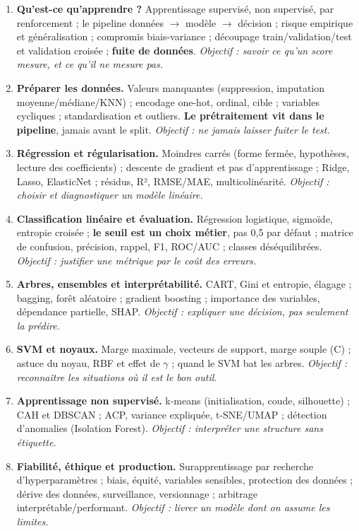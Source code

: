 \documentclass[10.5pt,a4paper]{article}
\begin{document}
\footnotesize
\begin{enumerate}[itemsep=3pt]
  \item \textbf{Qu'est-ce qu'apprendre ?} Apprentissage supervisé, non supervisé, par
        renforcement ; le pipeline données $\rightarrow$ modèle $\rightarrow$ décision ;
        risque empirique et généralisation ; compromis biais-variance ; découpage
        train/validation/test et validation croisée ; \textbf{fuite de données}.
        \textit{Objectif : savoir ce qu'un score mesure, et ce qu'il ne mesure pas.}

  \item \textbf{Préparer les données.} Valeurs manquantes (suppression, imputation
        moyenne/médiane/KNN) ; encodage one-hot, ordinal, cible ; variables cycliques ;
        standardisation et outliers. \textbf{Le prétraitement vit dans le pipeline},
        jamais avant le split. \textit{Objectif : ne jamais laisser fuiter le test.}

  \item \textbf{Régression et régularisation.} Moindres carrés (forme fermée, hypothèses,
        lecture des coefficients) ; descente de gradient et pas d'apprentissage ;
        Ridge, Lasso, ElasticNet ; résidus, R², RMSE/MAE, multicolinéarité.
        \textit{Objectif : choisir et diagnostiquer un modèle linéaire.}

  \item \textbf{Classification linéaire et évaluation.} Régression logistique, sigmoïde,
        entropie croisée ; \textbf{le seuil est un choix métier}, pas 0,5 par défaut ;
        matrice de confusion, précision, rappel, F1, ROC/AUC ; classes déséquilibrées.
        \textit{Objectif : justifier une métrique par le coût des erreurs.}

  \item \textbf{Arbres, ensembles et interprétabilité.} CART, Gini et entropie, élagage ;
        bagging, forêt aléatoire ; gradient boosting ; importance des variables,
        dépendance partielle, SHAP. \textit{Objectif : expliquer une décision, pas seulement
        la prédire.}

  \item \textbf{SVM et noyaux.} Marge maximale, vecteurs de support, marge souple (C) ;
        astuce du noyau, RBF et effet de $\gamma$ ; quand le SVM bat les arbres.
        \textit{Objectif : reconnaître les situations où il est le bon outil.}

  \item \textbf{Apprentissage non supervisé.} k-means (initialisation, coude, silhouette) ;
        CAH et DBSCAN ; ACP, variance expliquée, t-SNE/UMAP ; détection d'anomalies
        (Isolation Forest). \textit{Objectif : interpréter une structure sans étiquette.}

  \item \textbf{Fiabilité, éthique et production.} Surapprentissage par recherche
        d'hyperparamètres ; biais, équité, variables sensibles, protection des données ;
        dérive des données, surveillance, versionnage ; arbitrage interprétable/performant.
        \textit{Objectif : livrer un modèle dont on assume les limites.}
\end{enumerate}
\normalsize
\end{document}
